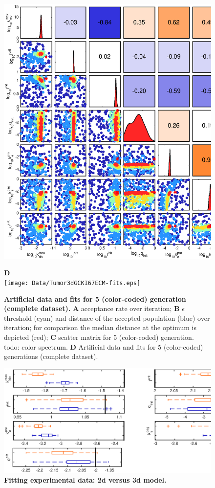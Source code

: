 \documentclass[10pt,letterpaper]{article}
\begin{document}
\begin{figure}[htbp]
\begin{minipage}[t]{0.66\textwidth}
\includegraphics[width=\textwidth]{Data/Tumor3dGCKI67ECM-scatterPlotMatrix.eps}
\end{minipage}
\textbf{D}\\
\texttt{[image: Data/Tumor3dGCKI67ECM-fits.eps]}
\caption{{\bf Artificial data and fits for 5 (color-coded) generation (complete dataset).}
\textbf{A}  acceptance rate over iteration; \textbf{B} $\epsilon$ threshold (cyan) and distance of the accepted population (blue) over iteration; for comparison the median distance at the optimum is depicted (red); \textbf{C} scatter matrix for 5 (color-coded) generation. todo: color spectrum. \textbf{D} Artificial data and fits for 5 (color-coded) generations (complete dataset).}
\label{fig:exp3d}
\end{figure}

\begin{figure}[htbp]
\includegraphics[width=\textwidth]{Data/TumorXXXdGCKI67ECMindependentBoxplots}
\caption{{\bf Fitting experimental data: 2d versus 3d model.}
}
\label{fig:exp2dvs3d}
\end{figure}
\end{document}
